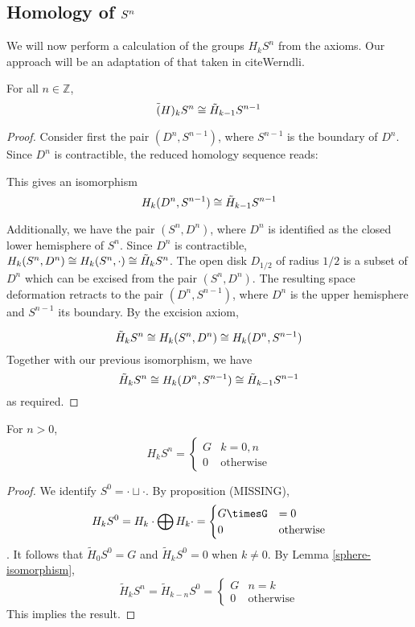 \subsection{Homology of $\S{n}$}
We will now perform a calculation of the groups $H_kS^{n}$ from the axioms. Our approach will be an adaptation of that taken in cite{Werndli}. 

\begin{lemma}\label{sphere-isomorphism} For all $n\in \mathbb{Z}$,
$$\tilde(H)_kS^n\iso \tilde{H}_{k-1}S^{n-1}$$
\end{lemma}
\begin{proof}
Consider first the pair $(D^n,S^{n-1})$, where $S^{n-1}$ is the boundary of $D^n$. Since $D^n$ is contractible, the reduced homology sequence reads:
This gives an isomorphism
$$H_k(D^n,S^{n-1})\iso \tilde{H}_{k-1}S^{n-1}$$

Additionally, we have the pair $(S^n,D^n)$, where $D^n$ is identified as the closed lower hemisphere of $S^n$. Since $D^n$ is contractible, $H_k(S^n,D^n)\iso H_k(S^n,\cdot)\iso\tilde{H}_kS^n$.  The open disk $D_{1/2}$ of radius $1/2$ is a subset of $D^n$ which can be excised from the pair $(S^n,D^n)$. The resulting space deformation retracts to the pair $(D^n,S^{n-1})$, where $D^n$ is the upper hemisphere and $S^{n-1}$ its boundary. By the excision axiom,

$$\tilde{H}_kS^n\iso H_k (S^n,D^n)\iso H_k(D^n,S^{n-1})$$
Together with our previous isomorphism, we have
$$\tilde{H}_kS^n\iso H_k(D^n,S^{n-1})\iso \tilde{H}_{k-1}S^{n-1}$$
as required.


\end{proof}

\begin{proposition}
For $n>0$,
$$H_kS^n=\begin{cases}G&k=0,n \\ 0 & \text{otherwise}\end{cases}$$
\end{proposition}
\begin{proof}
We identify $S^{0}=\cdot \sqcup \cdot$. By proposition (MISSING), $$H_k S^{0}=H_k\cdot \bigoplus H_k \cdot=\begin{cases}G\timesG &=0\\ 0 & \text{otherwise}\end{cases}$$. It follows that $\tilde{H}_0S^{0}=G$ and $\tilde{H}_kS^{0}=0$ when $k\neq 0$. By Lemma \ref{sphere-isomorphism}, $$\tilde{H}_kS^n=\tilde{H}_{k-n}S^{0}=\begin{cases}G & n=k\\0 & \text{otherwise}\end{cases}$$
This implies the result.
\end{proof}

